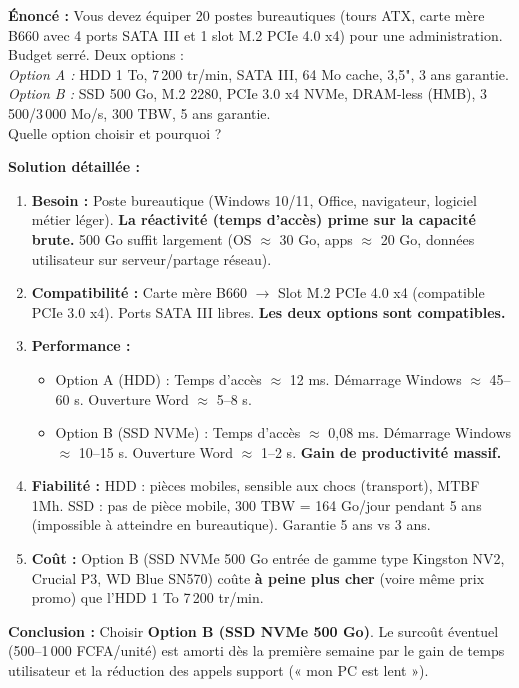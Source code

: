 \documentclass[11pt]{article}
\begin{document}
\begin{exoresolu}
\textbf{Énoncé :} Vous devez équiper 20 postes bureautiques (tours ATX, carte mère B660 avec 4 ports SATA III et 1 slot M.2 PCIe 4.0 x4) pour une administration. Budget serré. Deux options :\\
\textit{Option A :} HDD 1 To, 7\,200 tr/min, SATA III, 64 Mo cache, 3,5", 3 ans garantie.\\
\textit{Option B :} SSD 500 Go, M.2 2280, PCIe 3.0 x4 NVMe, DRAM-less (HMB), 3\,500/3\,000 Mo/s, 300 TBW, 5 ans garantie.\\
Quelle option choisir et pourquoi ?

\tcblower
\textbf{Solution détaillée :}
\begin{enumerate}
    \item \textbf{Besoin :} Poste bureautique (Windows 10/11, Office, navigateur, logiciel métier léger). \textbf{La réactivité (temps d'accès) prime sur la capacité brute.} 500 Go suffit largement (OS $\approx$ 30 Go, apps $\approx$ 20 Go, données utilisateur sur serveur/partage réseau).
    \item \textbf{Compatibilité :} Carte mère B660 $\rightarrow$ Slot M.2 PCIe 4.0 x4 (compatible PCIe 3.0 x4). Ports SATA III libres. \textbf{Les deux options sont compatibles.}
    \item \textbf{Performance :}
    \begin{itemize}
        \item Option A (HDD) : Temps d'accès $\approx$ 12 ms. Démarrage Windows $\approx$ 45--60 s. Ouverture Word $\approx$ 5--8 s.
        \item Option B (SSD NVMe) : Temps d'accès $\approx$ 0,08 ms. Démarrage Windows $\approx$ 10--15 s. Ouverture Word $\approx$ 1--2 s. \textbf{Gain de productivité massif.}
    \end{itemize}
    \item \textbf{Fiabilité :} HDD : pièces mobiles, sensible aux chocs (transport), MTBF 1Mh. SSD : pas de pièce mobile, 300 TBW = 164 Go/jour pendant 5 ans (impossible à atteindre en bureautique). Garantie 5 ans vs 3 ans.
    \item \textbf{Coût :} Option B (SSD NVMe 500 Go entrée de gamme type Kingston NV2, Crucial P3, WD Blue SN570) coûte \textbf{à peine plus cher} (voire même prix promo) que l'HDD 1 To 7\,200 tr/min.
\end{enumerate}
\textbf{Conclusion :} Choisir \textbf{Option B (SSD NVMe 500 Go)}. Le surcoût éventuel (500--1\,000 FCFA/unité) est amorti dès la première semaine par le gain de temps utilisateur et la réduction des appels support (« mon PC est lent »).
\end{exoresolu}
\end{document}
